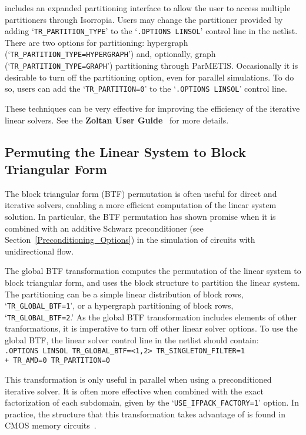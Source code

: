 \Xyce{} includes an expanded partitioning interface to allow the user to access multiple partitioners through Isorropia. 
Users may change the partitioner provided by adding `\texttt{TR\_PARTITION\_TYPE}' to the `\texttt{.OPTIONS LINSOL}' control line in
the netlist. There are two options for partitioning:  hypergraph
(`\texttt{TR\_PARTITION\_TYPE=HYPERGRAPH}') and, optionally, graph (`\texttt{TR\_PARTITION\_TYPE=GRAPH}') partitioning through ParMETIS.
Occasionally it is desirable to turn off the partitioning option, even for parallel simulations.   To do so, users can add the 
`\texttt{TR\_PARTITION=0}' to the `\texttt{.OPTIONS LINSOL}' control line.

These techniques can be very effective for improving the
efficiency of the iterative linear solvers.
See the \textbf{Zoltan User Guide}~\cite{zoltan:user} for more details.

\subsection{Permuting the Linear System to Block Triangular Form}
\label{BTF_Precond}
The block triangular form (BTF) permutation is often useful for direct and iterative
solvers, enabling a more efficient computation of the linear system solution.
In particular, the BTF permutation has shown promise when it is combined with
an additive Schwarz preconditioner (see Section~\ref{Preconditioning_Options}) in the simulation of
circuits with unidirectional flow.  

The global BTF transformation computes the permutation of the linear system to
block triangular form, and uses the block structure to partition the linear system. The partitioning can be
a simple linear distribution of block rows, `\texttt{TR\_GLOBAL\_BTF=1}', or a
hypergraph partitioning of block rows, `\texttt{TR\_GLOBAL\_BTF=2}.'
As the global BTF transformation includes elements of other tranformations,
it is imperative to turn off other linear solver options.  
To use the global BTF, the linear solver control line in the netlist should 
contain: \\[0.5em] 
\noindent \verb|.OPTIONS LINSOL TR_GLOBAL_BTF=<1,2> TR_SINGLETON_FILTER=1|\\
\noindent \verb|+ TR_AMD=0 TR_PARTITION=0|

This transformation is only useful in parallel when using a preconditioned iterative solver.
It is often more effective when combined with the exact factorization of each subdomain,
given by the `\texttt{USE\_IFPACK\_FACTORY=1}' option.  In practice, the structure
that this transformation takes advantage of is found in CMOS memory circuits~\cite{ICCAD09_precond}.


